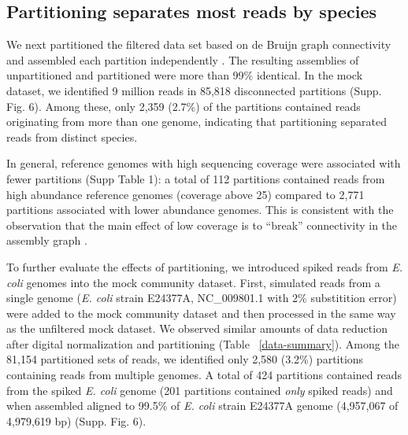 \documentclass[11pt]{article} %
\begin{document}
\subsection{Partitioning separates most reads by species}

We next partitioned the filtered data set based on de Bruijn graph
connectivity and assembled each partition independently
\cite{howeartifacts, Pell:2012cq}. The resulting assemblies of
unpartitioned and partitioned were more than 99\% identical.  In the
mock dataset, we identified 9 million reads in 85,818 disconnected
partitions (Supp. Fig. 6).  Among these, only 2,359 (2.7\%) of the
partitions contained reads originating from more than one genome,
indicating that partitioning separated reads from distinct
species.

In general, reference genomes with high sequencing coverage were
associated with fewer partitions (Supp Table 1): a
total of 112 partitions contained reads from high abundance reference
genomes (coverage above 25) compared to 2,771 partitions associated
with lower abundance genomes.  This is consistent
with the observation that the main effect of low coverage is to
``break'' connectivity in the assembly graph \cite{Chaisson:2008p1373,Pevzner:2001p1374}.

To further evaluate the effects of partitioning, we introduced spiked reads from
\emph{E. coli} genomes into the mock community
dataset. First, simulated reads from a single genome (\emph{E. coli} strain
E24377A, NC\_009801.1 with 2\% substitition error) were added to the
mock community dataset and then processed in the same way as the
unfiltered mock dataset.  We observed similar amounts of data
reduction after digital normalization and partitioning (Table
~\ref{data-summary}).  Among the 81,154 partitioned sets of reads, we
identified only 2,580 (3.2\%) partitions containing reads from
multiple genomes.  A total of 424 partitions contained reads from the
spiked \emph{E. coli} genome (201 partitions contained \emph{only}
spiked reads) and when assembled aligned to 99.5\% of \emph{E. coli}
strain E24377A genome (4,957,067 of 4,979,619 bp) (Supp. Fig. 6).
\end{document}
